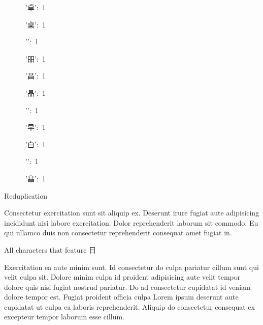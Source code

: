 \begin{multicols}{3}
{      '{\cjk{}卓}': 1\par
      '{\cjk{}桌}': 1\par
      '{}': 1\par
      '{\cjk{}昍}': 1\par
      '{\cjk{}昌}': 1\par
      '{\cjk{}晶}': 1\par
      '{}': 1\par
      '{\cjk{}早}': 1\par
      '{\cjk{}白}': 1\par
      '{}': 1\par
      '{\cjk{}皛}': 1\par
\null\par
Reduplication\par
\null\par
}

\end{multicols}

\mktsRuleSwell{}

\vspace{\mktsLineheight}\begin{multicols}{2}\raggedcolumns{}

Consectetur exercitation sunt sit aliquip ex. Deserunt irure fugiat aute adipisicing incididunt nisi labore exercitation.
Dolor reprehenderit laborum sit commodo. Eu qui ullamco duis non consectetur reprehenderit consequat amet fugiat
in.

\end{multicols}


{\mktsHTwo{}All characters that feature {\cjk{}日}\mktsHTwoBeg}%


\vspace{\mktsLineheight}\begin{multicols}{3}\raggedcolumns{}Exercitation ea aute minim sunt. Id consectetur do culpa pariatur cillum sunt qui velit culpa sit. Dolore minim culpa id proident adipisicing aute velit tempor dolore quis nisi fugiat nostrud pariatur. Do ad consectetur cupidatat id veniam dolore tempor est. Fugiat proident officia culpa Lorem ipsum deserunt aute cupidatat ut culpa ea laboris reprehenderit. Aliquip do consectetur consequat ex excepteur tempor laborum esse cillum.



\end{multicols}



